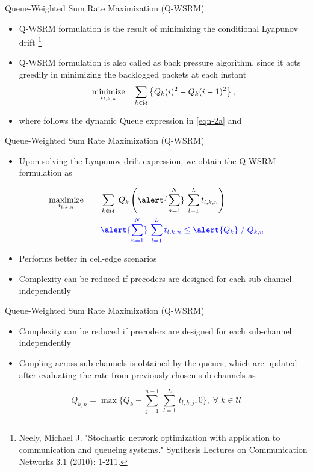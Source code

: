 \documentclass[10pt]{beamer}
\begin{document}
\begin{frame}{Queue-Weighted Sum Rate Maximization (\acs{Q-WSRM})}
\begin{itemize}
\item \acs{Q-WSRM} formulation is the result of minimizing the conditional Lyapunov drift \footnote{Neely, Michael J. "Stochastic network optimization with application to communication and queueing systems." Synthesis Lectures on Communication Networks 3.1 (2010): 1-211.}
\item \acs{Q-WSRM} formulation is also called as back pressure algorithm, since it acts greedily in minimizing the backlogged packets at each instant
\[ \underset{t_{l,k,n}}{\text{minimize}} \quad \sum_{k \in \mathcal{U}} \left \lbrace Q_k(i)^2 - Q_k(i-1)^2 \right \rbrace, \]
\item where  follows the dynamic Queue expression in \eqref{eqn-2a} and 
\end{itemize}
\end{frame}

\begin{frame}{Queue-Weighted Sum Rate Maximization (\acs{Q-WSRM})}
\begin{itemize}
\item Upon solving the Lyapunov drift expression, we obtain the \acs{Q-WSRM} formulation as
\end{itemize}
\begin{subequations}
\begin{align}
 \underset{t_{l,k,n}}{\text{maximize}} & \qquad \sum_{k \in \mc{U}} \; Q_k \left ( \alert{\sum_{n=1}^N} \, \sum_{l = 1}^L  t_{l,k,n} \right ) \\
& \qquad {\color{blue} \alert{\sum_{n=1}^N} \, \sum_{l = 1}^L  t_{l,k,n}  \leq \alert{Q_k} \; / \; Q_{k,n}}
\end{align}
\end{subequations}
\begin{itemize}
\item Performs better in cell-edge scenarios
\item Complexity can be reduced if precoders are designed for each sub-channel independently
\end{itemize}
\end{frame}

\begin{frame}{Queue-Weighted Sum Rate Maximization (\acs{Q-WSRM})}
	\begin{itemize}
		\item Complexity can be reduced if precoders are designed for each sub-channel independently
		\item Coupling across sub-channels is obtained by the queues, which are updated after evaluating the rate from previously chosen sub-channels as
	\end{itemize}
	\begin{equation*}
	Q_{k,n} = \max{\Big \lbrace Q_k - \sum_{j = 1}^{n-1} \, \sum_{l = 1}^{L} \, t_{l,k,j} ,0 \Big \rbrace }, \; \forall \; k \in \mathcal{U}
	\end{equation*}
\end{frame}
\end{document}
